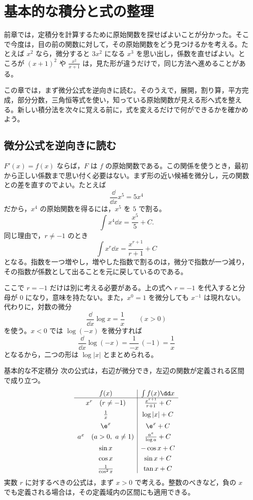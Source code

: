 \chapter{基本的な積分と式の整理}\label{章:基本積分}

前章では，定積分を計算するために原始関数を探せばよいことが分かった。そこで今度は，目の前の関数に対して，その原始関数をどう見つけるかを考える。たとえば $x^2$ なら，微分すると $3x^2$ になる $x^3$ を思い出し，係数を直せばよい。ところが $(x+1)^2$ や $\frac{x^2}{x+1}$ は，見た形が違うだけで，同じ方法へ進めることがある。

この章では，まず微分公式を逆向きに読む。そのうえで，展開，割り算，平方完成，部分分数，三角恒等式を使い，知っている原始関数が見える形へ式を整える。新しい積分法を次々に覚える前に，式を変えるだけで何ができるかを確かめよう。

\section{微分公式を逆向きに読む}\label{節:基本公式の逆}

$F'(x)=f(x)$ ならば，$F$ は $f$ の原始関数である。この関係を使うとき，最初から正しい係数まで思い付く必要はない。まず形の近い候補を微分し，元の関数との差を直すのでよい。たとえば
\[
 \frac{\dd}{\dd x}x^5=5x^4
\]
だから，$x^4$ の原始関数を得るには，$x^5$ を $5$ で割る。
\[
 \int x^4\dd x=\frac{x^5}{5}+C.
\]
同じ理由で，$r\ne-1$ のとき
\[
 \int x^r\dd x=\frac{x^{r+1}}{r+1}+C
\]
となる。指数を一つ増やし，増やした指数で割るのは，微分で指数が一つ減り，その指数が係数として出ることを元に戻しているのである。

ここで $r=-1$ だけは別に考える必要がある。上の式へ $r=-1$ を代入すると分母が $0$ になり，意味を持たない。また，$x^0=1$ を微分しても $x^{-1}$ は現れない。代わりに，対数の微分
\[
 \frac{\dd}{\dd x}\log x=\frac1x\qquad(x>0)
\]
を使う。$x<0$ では $\log(-x)$ を微分すれば
\[
 \frac{\dd}{\dd x}\log(-x)
 =\frac1{-x}\,(-1)=\frac1x
\]
となるから，二つの形は $\log|x|$ とまとめられる。

\begin{theorem}{基本的な不定積分}
次の公式は，右辺が微分でき，左辺の関数が定義される区間で成り立つ。
\[
\begin{array}{c|c}
 f(x)&\int f(x)\dd x\\ \hline
 x^r\quad(r\ne-1)&\frac{x^{r+1}}{r+1}+C\\[5pt]
 \frac1x&\log|x|+C\\[5pt]
 \e^x&\e^x+C\\[3pt]
 a^x\quad(a>0,\ a\ne1)&\frac{a^x}{\log a}+C\\[5pt]
 \sin x&-\cos x+C\\[3pt]
 \cos x&\sin x+C\\[3pt]
 \frac1{\cos^2x}&\tan x+C
\end{array}
\]
実数 $r$ に対するべきの公式は，まず $x>0$ で考える。整数のべきなど，負の $x$ でも定義される場合は，その定義域内の区間にも適用できる。
\end{theorem}

